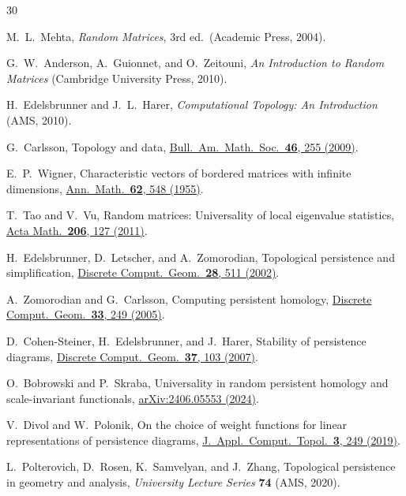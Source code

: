 \documentclass[aps,pre,twocolumn,superscriptaddress,showpacs]{revtex4-2}
\begin{document}
\begin{thebibliography}{30}

M.~L.\ Mehta,
\textit{Random Matrices},
3rd ed.\ (Academic Press, 2004).

G.~W.\ Anderson, A.~Guionnet, and O.~Zeitouni,
\textit{An Introduction to Random Matrices}
(Cambridge University Press, 2010).

H.~Edelsbrunner and J.~L.\ Harer,
\textit{Computational Topology: An Introduction}
(AMS, 2010).

G.~Carlsson,
Topology and data,
\href{https://doi.org/10.1090/S0273-0979-09-01249-X}{Bull.\ Am.\ Math.\ Soc.\ \textbf{46}, 255 (2009)}.

E.~P.\ Wigner,
Characteristic vectors of bordered matrices with infinite dimensions,
\href{https://doi.org/10.2307/1970079}{Ann.\ Math.\ \textbf{62}, 548 (1955)}.

T.~Tao and V.~Vu,
Random matrices: Universality of local eigenvalue statistics,
\href{https://doi.org/10.4310/ACTA.2011.v206.n1.a3}{Acta Math.\ \textbf{206}, 127 (2011)}.

H.~Edelsbrunner, D.~Letscher, and A.~Zomorodian,
Topological persistence and simplification,
\href{https://doi.org/10.1007/s00454-002-2885-2}{Discrete Comput.\ Geom.\ \textbf{28}, 511 (2002)}.

A.~Zomorodian and G.~Carlsson,
Computing persistent homology,
\href{https://doi.org/10.1007/s00454-004-1146-y}{Discrete Comput.\ Geom.\ \textbf{33}, 249 (2005)}.

D.~Cohen-Steiner, H.~Edelsbrunner, and J.~Harer,
Stability of persistence diagrams,
\href{https://doi.org/10.1007/s00454-006-1276-5}{Discrete Comput.\ Geom.\ \textbf{37}, 103 (2007)}.

O.~Bobrowski and P.~Skraba,
Universality in random persistent homology and scale-invariant functionals,
\href{https://arxiv.org/abs/2406.05553}{arXiv:2406.05553 (2024)}.

V.~Divol and W.~Polonik,
On the choice of weight functions for linear representations of persistence diagrams,
\href{https://doi.org/10.1007/s41468-019-00032-z}{J.\ Appl.\ Comput.\ Topol.\ \textbf{3}, 249 (2019)}.

L.~Polterovich, D.~Rosen, K.~Samvelyan, and J.~Zhang,
Topological persistence in geometry and analysis,
\textit{University Lecture Series} \textbf{74} (AMS, 2020).


\end{thebibliography}
\end{document}
